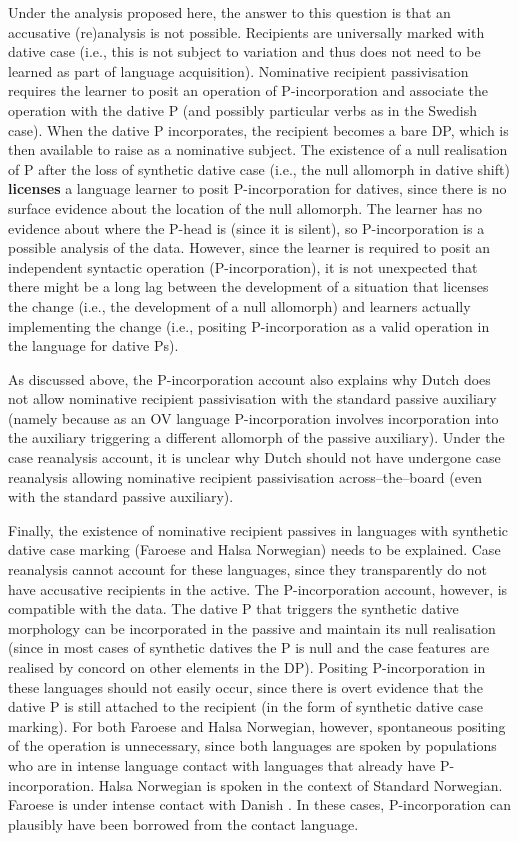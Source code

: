 Under the analysis proposed here, the answer to this question is that an accusative (re)analysis is not possible. Recipients are universally marked with dative case (i.e., this is not subject to variation and thus does not need to be learned as part of language acquisition). Nominative recipient passivisation requires the learner to posit an operation of P-incorporation and associate the operation with the dative P (and possibly particular verbs as in the Swedish case). When the dative P incorporates, the recipient becomes a bare DP, which is then available to raise as a nominative subject. The existence of a null realisation of P after the loss of synthetic dative case (i.e., the null allomorph in dative shift) \textbf{licenses} a language learner to posit P-incorporation for datives, since there is no surface evidence about the location of the null allomorph. The learner has no evidence about where the P-head is (since it is silent), so P-incorporation is a possible analysis of the data. However, since the learner is required to posit an independent syntactic operation (P-incorporation), it is not unexpected that there might be a long lag between the development of a situation that licenses the change (i.e., the development of a null allomorph) and learners actually implementing the change (i.e., positing P-incorporation as a valid operation in the language for dative Ps).

As discussed above, the P-incorporation account also explains why Dutch does not allow nominative recipient passivisation with the standard passive auxiliary (namely because as an OV language P-incorporation involves incorporation into the auxiliary triggering a different allomorph of the passive auxiliary). Under the case reanalysis account, it is unclear why Dutch should not have undergone case reanalysis allowing nominative recipient passivisation across--the--board (even with the standard passive auxiliary).

Finally, the existence of nominative recipient passives in languages with synthetic dative case marking (Faroese and Halsa Norwegian) needs to be explained. Case reanalysis cannot account for these languages, since they transparently do not have accusative recipients in the active. The P-incorporation account, however, is compatible with the data. The dative P that triggers the synthetic dative morphology can be incorporated in the passive and maintain its null realisation (since in most cases of synthetic datives the P is null and the case features are realised by concord on other elements in the DP). Positing P-incorporation in these languages should not easily occur, since there is overt evidence that the dative P is still attached to the recipient (in the form of synthetic dative case marking). For both Faroese and Halsa Norwegian, however, spontaneous positing of the operation is unnecessary, since both languages are spoken by populations who are in intense language contact with languages that already have P-incorporation. Halsa Norwegian is spoken in the context of Standard Norwegian. Faroese is under intense contact with Danish \citep{petersen.2010}. In these cases, P-incorporation can plausibly have been borrowed from the contact language.


